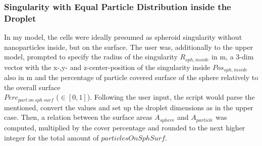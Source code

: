 \subsubsection{Singularity with Equal Particle Distribution inside the Droplet}
In my model, the cells were ideally presumed as spheroid singularity without nanoparticles inside, but on the surface. The user was, additionally to the upper model, prompted to specify the radius of the singularity $R_{sph,inside}$ in \SIUnitSymbolMicro m, a 3-dim vector with the x-,y- and z-center-position of the singularity inside $Pos_{sph,inside}$ also in \SIUnitSymbolMicro m and the percentage  of particle covered surface of the sphere relatively to the overall surface \\ $Perc_{part\ on\ sph\ surf}$ ($\in [0,1]$).
Following the user input, the script would parse the mentioned, convert the values and set up the droplet dimensions as in the upper case. Then, a relation between the surface areas $A_{sphere}$ and $A_{particle}$ was computed, multiplied by the cover percentage and rounded to the next higher integer for the total amount of $particlesOnSphSurf$.

